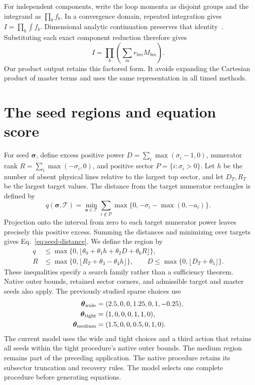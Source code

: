 For independent components, write the loop momenta as disjoint groups and the integrand as $\prod_b f_b$. In a convergence domain, repeated integration gives $I=\prod_b\int f_b$. Dimensional analytic continuation preserves that identity~\cite{Weinzierl2022}. Substituting each exact component reduction therefore gives
\begin{equation}
 I=\prod_b\left(\sum_m r_{bm}M_{bm}\right).
 \label{eq:product-reduction}
\end{equation}
Our product output retains this factored form. It avoids expanding the Cartesian product of master terms and uses the same representation in all timed methods.

\section{The seed regions and equation score}
\label{app:sparse}
For seed $\boldsymbol\sigma$, define excess positive power $D=\sum_i\max(\sigma_i-1,0)$, numerator rank $R=\sum_i\max(-\sigma_i,0)$, and positive sector $P=\{i:\sigma_i>0\}$. Let $h$ be the number of absent physical lines relative to the largest top sector, and let $D_T,R_T$ be the largest target values. The distance from the target numerator rectangles is defined by
\begin{equation}
 q(\boldsymbol\sigma,\mathcal T)=\min_{\boldsymbol a\in\mathcal T}
 \sum_{i\notin P}\max\{0,-\sigma_i-\max(0,-a_i)\}.
 \label{eq:seed-distance}
\end{equation}
Projection onto the interval from zero to each target numerator power leaves precisely this positive excess. Summing the distances and minimizing over targets gives Eq.~\eqref{eq:seed-distance}. We define the region by
\begin{align}
 q&\leq\max\{0,\lfloor\theta_0+\theta_1h+\theta_2D+\theta_6R\rfloor\},\nonumber\\
 R&\leq\max\{0,\lfloor R_T+\theta_3-\theta_4h\rfloor\},\qquad
 D\leq\max\{0,\lfloor D_T+\theta_5\rfloor\}.
 \label{eq:seed-regions}
\end{align}
These inequalities specify a search family rather than a sufficiency theorem. Native outer bounds, retained sector corners, and admissible target and master seeds also apply. The previously studied sparse choices use
\begin{align}
 \boldsymbol\theta_{\rm wide}&=(2.5,0,0,1.25,0,1,-0.25),\nonumber\\
 \boldsymbol\theta_{\rm tight}&=(1,0,0,0,1,1,0),\nonumber\\
 \boldsymbol\theta_{\rm medium}&=(1.5,0,0,0.5,0,1,0).
 \label{eq:seed-values}
\end{align}
The current model uses the wide and tight choices and a third action that retains all seeds within the tight procedure's native outer bounds. The medium region remains part of the preceding application. The native procedure retains its subsector truncation and recovery rules. The model selects one complete procedure before generating equations.

